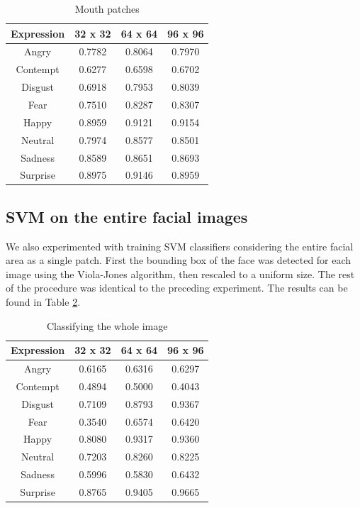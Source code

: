 \begin{table}
\caption{Mouth patches}
\label{table:mouth}

\begin{tabular}{| c | c | c | c |}
\hline
Expression & 32 x 32 &  64 x 64  & 96 x 96  \\

\hline
Angry	&	0.7782	&	0.8064	&	0.7970	\\
Contempt	&	0.6277	&	0.6598	& 0.6702 \\
Disgust	&	0.6918	&	0.7953	&	0.8039	\\
Fear	&	0.7510	&	0.8287	&	0.8307	\\
Happy	&	0.8959	&	0.9121	&	0.9154	\\
Neutral	&	0.7974	&	0.8577	&	0.8501	\\
Sadness	&	0.8589	&	0.8651	&	0.8693	\\
Surprise &	0.8975	&	0.9146	&	0.8959	\\

\hline
\end{tabular}
\end{table}

\subsection{SVM on the entire facial images}
We also experimented with training SVM classifiers considering the entire facial area as a single patch. First the bounding box of the face was detected
for each image using the Viola-Jones algorithm, then rescaled to a uniform size. %
The rest of the procedure was identical to the preceding experiment. The results can be found in Table \ref{table:entire_images}.

\begin{table}
\caption{Classifying the whole image}
\label{table:entire_images}

\begin{tabular}{| c | c | c | c |}
\hline
Expression & 32 x 32 &  64 x 64  & 96 x 96  \\

\hline
Angry	 & 0.6165 & 0.6316 & 0.6297	\\
Contempt & 0.4894 & 0.5000 & 0.4043	\\
Disgust	 & 0.7109 & 0.8793 & 0.9367	\\
Fear	 & 0.3540 & 0.6574 & 0.6420	\\
Happy	 & 0.8080 & 0.9317 & 0.9360	\\
Neutral	 & 0.7203 & 0.8260 & 0.8225	\\
Sadness	 & 0.5996 & 0.5830 & 0.6432	\\
Surprise & 0.8765 & 0.9405 & 0.9665	\\

\hline
\end{tabular}
\end{table}



